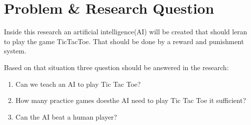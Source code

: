 \section{Problem \& Research Question}

Inside this research an artificial intelligence(AI) will be created that should leran to play the game TicTacToe. That should be done by a reward and punishment system.

Based on that situation three question should be answered in the research:
\begin{enumerate}
	\item Can we teach an AI to play Tic Tac Toe?
	\item How many practice games doesthe AI need to play Tic Tac Toe it sufficient?
	\item Can the AI beat a human player?
\end{enumerate}

